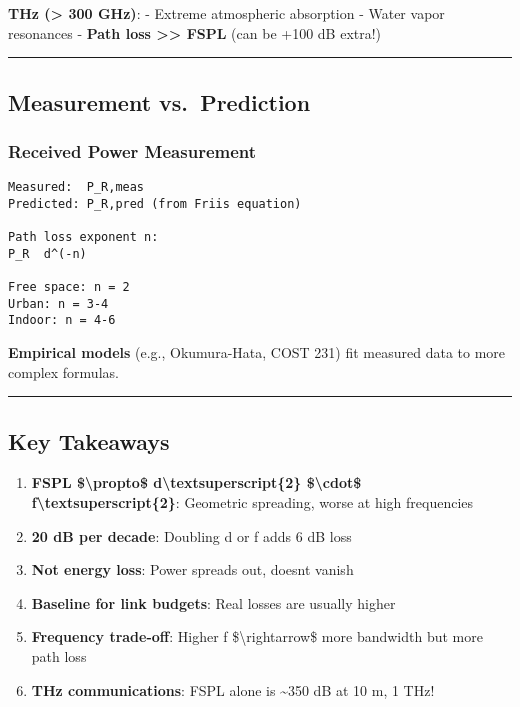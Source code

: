 \textbf{THz (\textgreater{} 300 GHz)}: - Extreme atmospheric absorption
- Water vapor resonances - \textbf{Path loss \textgreater\textgreater{}
FSPL} (can be +100 dB extra!)

\begin{center}\rule{0.5\linewidth}{0.5pt}\end{center}

\subsection{\texorpdfstring{ Measurement
vs.~Prediction}{ Measurement vs.~Prediction}}\label{measurement-vs.-prediction}

\subsubsection{Received Power
Measurement}\label{received-power-measurement}

\begin{verbatim}
Measured:  P_R,meas
Predicted: P_R,pred (from Friis equation)

Path loss exponent n:
P_R  d^(-n)

Free space: n = 2
Urban: n = 3-4
Indoor: n = 4-6
\end{verbatim}

\textbf{Empirical models} (e.g., Okumura-Hata, COST 231) fit measured
data to more complex formulas.

\begin{center}\rule{0.5\linewidth}{0.5pt}\end{center}

\subsection{\texorpdfstring{ Key
Takeaways}{ Key Takeaways}}\label{key-takeaways}

\begin{enumerate}
\def\labelenumi{\arabic{enumi}.}
\tightlist
\item
  \textbf{FSPL \$\textbackslash propto\$
  d\textbackslash textsuperscript\{2\} \$\textbackslash cdot\$
  f\textbackslash textsuperscript\{2\}}: Geometric spreading, worse at
  high frequencies
\item
  \textbf{20 dB per decade}: Doubling d or f adds 6 dB loss
\item
  \textbf{Not energy loss}: Power spreads out, doesn\textquotesingle t
  vanish
\item
  \textbf{Baseline for link budgets}: Real losses are usually higher
\item
  \textbf{Frequency trade-off}: Higher f \$\textbackslash rightarrow\$
  more bandwidth but more path loss
\item
  \textbf{THz communications}: FSPL alone is \textasciitilde350 dB at 10
  m, 1 THz!
\end{enumerate}

